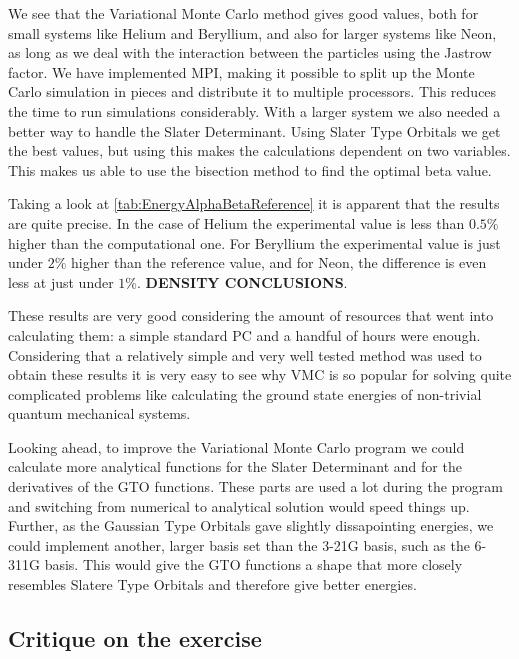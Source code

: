 We see that the Variational Monte Carlo method gives good values, both for small systems like Helium and Beryllium, and also for larger systems like Neon, as long as we deal with the interaction between the particles using the Jastrow factor. We have implemented MPI, making it possible to split up the Monte Carlo simulation in pieces and distribute it to multiple processors. This reduces the time to run simulations considerably. With a larger system we also needed a better way to handle the Slater Determinant. Using Slater Type Orbitals we get the best values, but using this makes the calculations dependent on two variables. This makes us able to use the bisection method to find the optimal beta value. 

Taking a look at \ref{tab:EnergyAlphaBetaReference} it is apparent that the results are quite precise. In the case of Helium the experimental value is less than $0.5\%$ higher than the computational one. For Beryllium the experimental value is just under $2\%$ higher than the reference value, and for Neon, the difference is even less at just under $1\%$. \textbf{DENSITY CONCLUSIONS}. 

These results are very good considering the amount of resources that went into calculating them: a simple standard PC and a handful of hours were enough. Considering that a relatively simple and very well tested method was used to obtain these results it is very easy to see why VMC is so popular for solving quite complicated problems like calculating the ground state energies of non-trivial quantum mechanical systems.

Looking ahead, to improve the Variational Monte Carlo program we could calculate more analytical functions for the Slater Determinant and for the derivatives of the GTO functions. These parts are used a lot during the program and switching from numerical to analytical solution would speed things up. Further, as the Gaussian Type Orbitals gave slightly dissapointing energies, we could implement another, larger basis set than the 3-21G basis, such as the 6-311G basis. This would give the GTO functions a shape that more closely resembles Slatere Type Orbitals and therefore give better energies.  

\subsection{Critique on the exercise}
